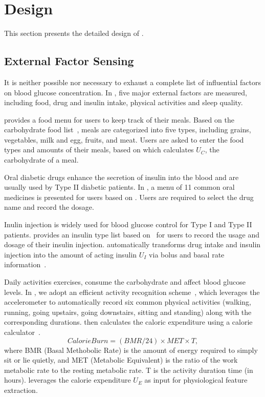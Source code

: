
\section{Design}
\label{sec:design}
This section presents the detailed design of \sysname.

\subsection{External Factor Sensing}
\label{subsec:external}
It is neither possible nor necessary to exhaust a complete list of influential factors on blood glucose concentration.
In \sysname, five major external factors are measured, including food, drug and insulin intake, physical activities and sleep quality.

\sysname provides a food menu for users to keep track of their meals.
Based on the carbohydrate food list~\cite{bib:carblist}, meals are categorized into five types, including grains, vegetables, milk and egg, fruits, and meat.
Users are asked to enter the food types and amounts of their meals, based on which \sysname calculates $U_C$, the carbohydrate of a meal.

Oral diabetic drugs enhance the secretion of insulin into the blood and are usually used by Type II diabetic patients.
In \sysname, a menu of 11 common oral medicines is presented for users based on \cite{bib:druglist}.
Users are required to select the drug name and record the dosage.

Inulin injection is widely used for blood glucose control for Type I and Type II patients.
\sysname provides an insulin type list based on~\cite{bib:insulinlist} for users to record the usage and dosage of their insulin injection.
\sysname automatically transforms drug intake and insulin injection into the amount of acting insulin $U_I$ via bolus and basal rate information~\cite{bib:MAIHA14:Plis}.

Daily activities \eg exercises, consume the carbohydrate and affect blood glucose levels.
In \sysname, we adopt an efficient activity recognition scheme~\cite{bib:KDDEN11:Kwapisz}, which leverages the accelerometer to automatically record six common physical activities (walking, running, going upstairs, going downstairs, sitting and standing) along with the corresponding durations.
\sysname then calculates the caloric expenditure using a calorie calculator~\cite{bib:CalorieCounter}.
\begin{equation}\label{eq:calorie_burn}
  Calorie Burn = (BMR/24)\times MET \times T,
\end{equation}
where BMR (Basal Methobolic Rate) is the amount of energy required to simply sit or lie quietly, and MET (Metabolic Equivalent) is the ratio of the work metabolic rate to the resting metabolic rate.
T is the activity duration time (in hours).
\sysname leverages the calorie expenditure $U_E$ as input for physiological feature extraction.

